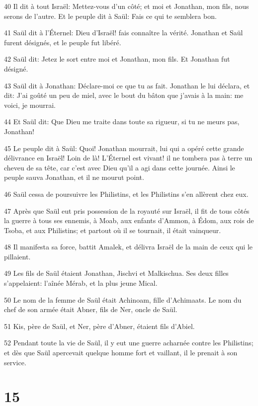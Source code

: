 \par 40 Il dit à tout Israël: Mettez-vous d'un côté; et moi et Jonathan, mon fils, nous serons de l'autre. Et le peuple dit à Saül: Fais ce qui te semblera bon.
\par 41 Saül dit à l'Éternel: Dieu d'Israël! fais connaître la vérité. Jonathan et Saül furent désignés, et le peuple fut libéré.
\par 42 Saül dit: Jetez le sort entre moi et Jonathan, mon fils. Et Jonathan fut désigné.
\par 43 Saül dit à Jonathan: Déclare-moi ce que tu as fait. Jonathan le lui déclara, et dit: J'ai goûté un peu de miel, avec le bout du bâton que j'avais à la main: me voici, je mourrai.
\par 44 Et Saül dit: Que Dieu me traite dans toute sa rigueur, si tu ne meurs pas, Jonathan!
\par 45 Le peuple dit à Saül: Quoi! Jonathan mourrait, lui qui a opéré cette grande délivrance en Israël! Loin de là! L'Éternel est vivant! il ne tombera pas à terre un cheveu de sa tête, car c'est avec Dieu qu'il a agi dans cette journée. Ainsi le peuple sauva Jonathan, et il ne mourut point.
\par 46 Saül cessa de poursuivre les Philistins, et les Philistins s'en allèrent chez eux.
\par 47 Après que Saül eut pris possession de la royauté sur Israël, il fit de tous côtés la guerre à tous ses ennemis, à Moab, aux enfants d'Ammon, à Édom, aux rois de Tsoba, et aux Philistins; et partout où il se tournait, il était vainqueur.
\par 48 Il manifesta sa force, battit Amalek, et délivra Israël de la main de ceux qui le pillaient.
\par 49 Les fils de Saül étaient Jonathan, Jischvi et Malkischua. Ses deux filles s'appelaient: l'aînée Mérab, et la plus jeune Mical.
\par 50 Le nom de la femme de Saül était Achinoam, fille d'Achimaats. Le nom du chef de son armée était Abner, fils de Ner, oncle de Saül.
\par 51 Kis, père de Saül, et Ner, père d'Abner, étaient fils d'Abiel.
\par 52 Pendant toute la vie de Saül, il y eut une guerre acharnée contre les Philistins; et dès que Saül apercevait quelque homme fort et vaillant, il le prenait à son service.

\chapter{15}

